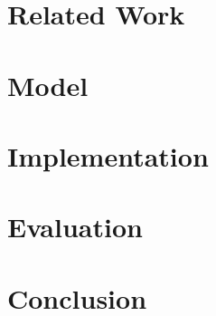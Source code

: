 \documentclass[conference]{IEEEtran}
\begin{document}
	\section{Related Work}
	\label{sec:relatedWork}
	

	\section{Model}
	\label{sec:04_model}
	

	\section{Implementation}
	\label{sec:implementation}
	

	\section{Evaluation}
	\label{sec:evaluation}
	

	\section{Conclusion}
	\label{sec:conclusion}
	


	
	

	\vspace{12pt}
\end{document}
